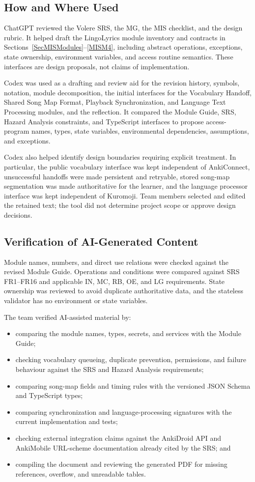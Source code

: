 \documentclass[12pt, titlepage]{article}
\begin{document}
\subsection{How and Where Used}
ChatGPT reviewed the Volere SRS, the MG, the MIS checklist, and
the design rubric. It helped draft the LingoLyrics module inventory
and contracts in Sections~\ref{SecMISModules}--\ref{MISM4},
including abstract operations, exceptions, state ownership,
environment variables, and access routine semantics. These
interfaces are design proposals, not claims of implementation.

Codex was used as a drafting and review aid for the revision history, symbols,
notation, module decomposition, the initial interfaces for the Vocabulary
Handoff, Shared Song Map Format, Playback Synchronization, and Language Text
Processing modules, and the reflection.  It compared the Module Guide, SRS,
Hazard Analysis constraints, and TypeScript interfaces to propose
access-program names, types, state variables, environmental dependencies,
assumptions, and exceptions.

Codex also helped identify design boundaries requiring explicit treatment.  In
particular, the public vocabulary interface was kept independent of
AnkiConnect, unsuccessful handoffs were made persistent and retryable, stored
song-map segmentation was made authoritative for the learner, and the language
processor interface was kept independent of Kuromoji.  Team members selected
and edited the retained text; the tool did not determine project scope or
approve design decisions.

\subsection{Verification of AI-Generated Content}
Module names, numbers, and direct use relations were checked
against the revised Module Guide. Operations and conditions were
compared against SRS FR1--FR16 and applicable IN, MC, RB, OE,
and LG requirements. State ownership was reviewed to avoid
duplicate authoritative data, and the stateless validator
has no environment or state variables.

The team verified AI-assisted material by:
\begin{itemize}
  \item comparing the module names, types, secrets, and services with the
  Module Guide;
  \item checking vocabulary queueing, duplicate prevention, permissions, and
  failure behaviour against the SRS and Hazard Analysis requirements;
  \item comparing song-map fields and timing rules with the versioned JSON
  Schema and TypeScript types;
  \item comparing synchronization and language-processing signatures with the
  current implementation and tests;
  \item checking external integration claims against the AnkiDroid API and
  AnkiMobile URL-scheme documentation already cited by the SRS; and
  \item compiling the document and reviewing the generated PDF for missing
  references, overflow, and unreadable tables.
\end{itemize}
\end{document}
